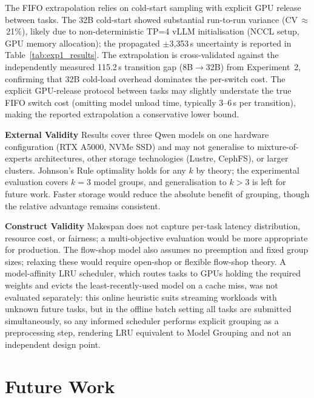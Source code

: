 \documentclass[logo,bsc,singlespacing,parskip,online]{infthesis}
\begin{document}
The FIFO extrapolation relies on cold-start sampling with explicit GPU release between tasks. The 32B cold-start showed substantial run-to-run variance (CV\,$\approx$\,21\%), likely due to non-deterministic TP=4 vLLM initialisation (NCCL setup, GPU memory allocation); the propagated $\pm$3{,}353\,s uncertainty is reported in Table~\ref{tab:exp1_results}. The extrapolation is cross-validated against the independently measured 115.2\,s transition gap (8B$\to$32B) from Experiment~2, confirming that 32B cold-load overhead dominates the per-switch cost. The explicit GPU-release protocol between tasks may slightly understate the true FIFO switch cost (omitting model unload time, typically 3--6\,s per transition), making the reported extrapolation a conservative lower bound.

\textbf{External Validity}
Results cover three Qwen models on one hardware configuration (RTX A5000, NVMe SSD) and may not generalise to mixture-of-experts architectures, other storage technologies (Lustre, CephFS), or larger clusters. Johnson's Rule optimality holds for any $k$ by theory; the experimental evaluation covers $k=3$ model groups, and generalisation to $k>3$ is left for future work. Faster storage would reduce the absolute benefit of grouping, though the relative advantage remains consistent.

\textbf{Construct Validity}
Makespan does not capture per-task latency distribution, resource cost, or fairness; a multi-objective evaluation would be more appropriate for production. The flow-shop model also assumes no preemption and fixed group sizes; relaxing these would require open-shop or flexible flow-shop theory. A model-affinity LRU scheduler, which routes tasks to GPUs holding the required weights and evicts the least-recently-used model on a cache miss, was not evaluated separately: this online heuristic suits streaming workloads with unknown future tasks, but in the offline batch setting all tasks are submitted simultaneously, so any informed scheduler performs explicit grouping as a preprocessing step, rendering LRU equivalent to Model Grouping and not an independent design point.





\chapter{Future Work}
\label{ch:future}
\end{document}
